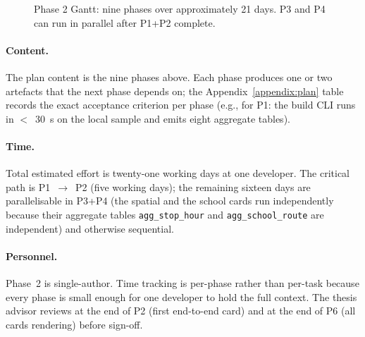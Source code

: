 \begin{figure}[H]
\centering
{}
\caption{Phase 2 Gantt: nine phases over approximately 21
days. P3 and P4 can run in parallel after P1+P2 complete.}
\label{fig:future:gantt}
\end{figure}

\paragraph{Content.}
The plan content is the nine phases above. Each phase produces
one or two artefacts that the next phase depends on; the
Appendix~\ref{appendix:plan} table records the exact acceptance
criterion per phase (e.g., for P1: the build CLI runs in
$<$~30~s on the local sample and emits eight aggregate tables).

\paragraph{Time.}
Total estimated effort is twenty-one working days at one
developer. The critical path is P1~$\rightarrow$~P2 (five
working days); the remaining sixteen days are parallelisable in
P3+P4 (the spatial and the school cards run independently
because their aggregate tables \texttt{agg\_stop\_hour} and
\texttt{agg\_school\_route} are independent) and otherwise
sequential.

\paragraph{Personnel.}
Phase~2 is single-author. Time tracking is per-phase rather
than per-task because every phase is small enough for one
developer to hold the full context. The thesis advisor reviews
at the end of P2 (first end-to-end card) and at the end of P6
(all cards rendering) before sign-off.

